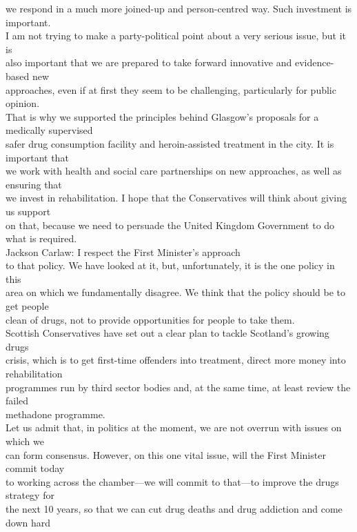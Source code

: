 \documentclass{article}
\begin{document}
\begin{description}
{we respond in a much more joined-up and person-centred way. Such investment is important.\\
I am not trying to make a party-political point about a very serious issue, but it is\\
also important that we are prepared to take forward innovative and evidence-based new\\
approaches, even if at first they seem to be challenging, particularly for public opinion.\\
That is why we supported the principles behind Glasgow’s proposals for a medically supervised\\
safer drug consumption facility and heroin-assisted treatment in the city. It is important that\\
we work with health and social care partnerships on new approaches, as well as ensuring that\\
we invest in rehabilitation. I hope that the Conservatives will think about giving us support\\
on that, because we need to persuade the United Kingdom Government to do what is required.\\
Jackson Carlaw: I respect the First Minister’s approach\\
to that policy. We have looked at it, but, unfortunately, it is the one policy in this\\
area on which we fundamentally disagree. We think that the policy should be to get people\\
clean of drugs, not to provide opportunities for people to take them.\\
Scottish Conservatives have set out a clear plan to tackle Scotland’s growing drugs\\
crisis, which is to get first-time offenders into treatment, direct more money into rehabilitation\\
programmes run by third sector bodies and, at the same time, at least review the failed\\
methadone programme.\\
Let us admit that, in politics at the moment, we are not overrun with issues on which we\\
can form consensus. However, on this one vital issue, will the First Minister commit today\\
to working across the chamber—we will commit to that—to improve the drugs strategy for\\
the next 10 years, so that we can cut drug deaths and drug addiction and come down hard\\
}
\end{description}
\end{document}
